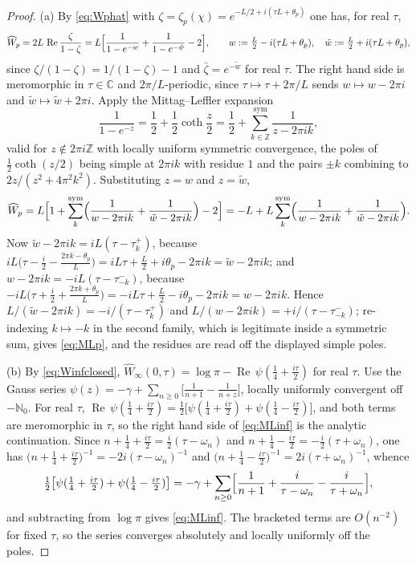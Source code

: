 \documentclass[11pt]{amsart}
\theoremstyle{definition}
\theoremstyle{remark}
\newcommand{\C}{\mathbb C}
\newcommand{\N}{\mathbb N}
\newcommand{\Z}{\mathbb Z}
\newcommand{\Rel}{\operatorname{Re}}
\newcommand{\Wh}{\widehat{W}}
\begin{document}
\begin{proof}
(a)  By \eqref{eq:Wphat} with
$\zeta=\zeta_p(\chi)=e^{-L/2+i(\tau L+\theta_p)}$ one has, for real $\tau$,
\begin{equation}\label{eq:twoexp}
\Wh_p=2L\,\Rel\frac{\zeta}{1-\zeta}
=L\Bigl[\frac{1}{1-e^{-w}}+\frac{1}{1-e^{-\tilde w}}-2\Bigr],\qquad
w:=\tfrac L2-i(\tau L+\theta_p),\quad \tilde w:=\tfrac L2+i(\tau L+\theta_p),
\end{equation}
since $\zeta/(1-\zeta)=1/(1-\zeta)-1$ and $\bar\zeta=e^{-\tilde w}$ for real
$\tau$.  The right hand side is meromorphic in $\tau\in\C$ and
$2\pi/L$-periodic, since $\tau\mapsto\tau+2\pi/L$ sends $w\mapsto w-2\pi i$ and
$\tilde w\mapsto\tilde w+2\pi i$.  Apply the Mittag--Leffler expansion
\begin{equation}\label{eq:coth}
\frac{1}{1-e^{-z}}=\frac12+\frac12\coth\frac z2
=\frac12+\sum_{k\in\Z}^{\mathrm{sym}}\frac{1}{z-2\pi ik},
\end{equation}
valid for $z\notin2\pi i\Z$ with locally uniform symmetric convergence, the
poles of $\tfrac12\coth(z/2)$ being simple at $2\pi ik$ with residue $1$ and
the pairs $\pm k$ combining to $2z/(z^{2}+4\pi^{2}k^{2})$.  Substituting
$z=w$ and $z=\tilde w$,
\[
\Wh_p=L\Bigl[1+\sum_k^{\mathrm{sym}}\Bigl(\frac1{w-2\pi ik}
+\frac1{\tilde w-2\pi ik}\Bigr)-2\Bigr]
=-L+L\sum_k^{\mathrm{sym}}\Bigl(\frac1{w-2\pi ik}+\frac1{\tilde w-2\pi ik}
\Bigr).
\]
Now $\tilde w-2\pi ik=iL(\tau-\tau_k^{+})$, because
$iL\bigl(\tau-\tfrac i2-\tfrac{2\pi k-\theta_p}{L}\bigr)
=iL\tau+\tfrac L2+i\theta_p-2\pi ik=\tilde w-2\pi ik$; and
$w-2\pi ik=-iL(\tau-\tau_{-k}^{-})$, because
$-iL\bigl(\tau+\tfrac i2+\tfrac{2\pi k+\theta_p}{L}\bigr)
=-iL\tau+\tfrac L2-i\theta_p-2\pi ik=w-2\pi ik$.  Hence
$L/(\tilde w-2\pi ik)=-i/(\tau-\tau_k^{+})$ and
$L/(w-2\pi ik)=+i/(\tau-\tau_{-k}^{-})$; re-indexing $k\mapsto-k$ in the second
family, which is legitimate inside a symmetric sum, gives \eqref{eq:MLp}, and
the residues are read off the displayed simple poles.

(b)  By \eqref{eq:Winfclosed}, $\Wh_{\infty}(0,\tau)=\log\pi-\Rel\,
\psi(\tfrac14+\tfrac{i\tau}2)$ for real $\tau$.  Use the Gauss series
$\psi(z)=-\gamma+\sum_{n\ge0}\bigl[\tfrac1{n+1}-\tfrac1{n+z}\bigr]$, locally
uniformly convergent off $-\N_0$.  For real $\tau$,
$\Rel\,\psi(\tfrac14+\tfrac{i\tau}2)=\tfrac12\bigl[\psi(\tfrac14+\tfrac{i\tau}2)
+\psi(\tfrac14-\tfrac{i\tau}2)\bigr]$, and both terms are meromorphic in
$\tau$, so the right hand side of \eqref{eq:MLinf} is the analytic
continuation.  Since $n+\tfrac14+\tfrac{i\tau}2=\tfrac i2(\tau-\omega_n)$ and
$n+\tfrac14-\tfrac{i\tau}2=-\tfrac i2(\tau+\omega_n)$, one has
$\bigl(n+\tfrac14+\tfrac{i\tau}2\bigr)^{-1}=-2i(\tau-\omega_n)^{-1}$ and
$\bigl(n+\tfrac14-\tfrac{i\tau}2\bigr)^{-1}=2i(\tau+\omega_n)^{-1}$, whence
\[
\tfrac12\bigl[\psi(\tfrac14+\tfrac{i\tau}2)+\psi(\tfrac14-\tfrac{i\tau}2)\bigr]
=-\gamma+\sum_{n\ge0}\Bigl[\frac1{n+1}+\frac{i}{\tau-\omega_n}
-\frac{i}{\tau+\omega_n}\Bigr],
\]
and subtracting from $\log\pi$ gives \eqref{eq:MLinf}.  The bracketed terms are
$O(n^{-2})$ for fixed $\tau$, so the series converges absolutely and locally
uniformly off the poles.


\end{proof}
\end{document}
